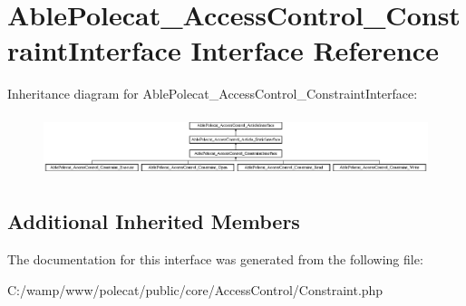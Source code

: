 \hypertarget{interface_able_polecat___access_control___constraint_interface}{}\section{Able\+Polecat\+\_\+\+Access\+Control\+\_\+\+Constraint\+Interface Interface Reference}
\label{interface_able_polecat___access_control___constraint_interface}
Inheritance diagram for Able\+Polecat\+\_\+\+Access\+Control\+\_\+\+Constraint\+Interface\+:\begin{figure}[H]
\begin{center}
\leavevmode
\includegraphics[height=1.806452cm]{interface_able_polecat___access_control___constraint_interface}
\end{center}
\end{figure}
\subsection*{Additional Inherited Members}


The documentation for this interface was generated from the following file\+:\begin{DoxyCompactItemize}
\item 
C\+:/wamp/www/polecat/public/core/\+Access\+Control/Constraint.\+php\end{DoxyCompactItemize}

